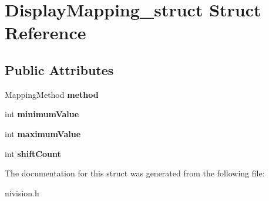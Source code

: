 \hypertarget{structDisplayMapping__struct}{
\section{DisplayMapping\_\-struct Struct Reference}
\label{structDisplayMapping__struct}
}
\subsection*{Public Attributes}
\begin{DoxyCompactItemize}
\item 
\hypertarget{structDisplayMapping__struct_aa364e1e9956c18eeb2474fef9ee14c87}{
MappingMethod {\bfseries method}}
\label{structDisplayMapping__struct_aa364e1e9956c18eeb2474fef9ee14c87}

\item 
\hypertarget{structDisplayMapping__struct_a49cef936a2beae40e29127ff5b674e04}{
int {\bfseries minimumValue}}
\label{structDisplayMapping__struct_a49cef936a2beae40e29127ff5b674e04}

\item 
\hypertarget{structDisplayMapping__struct_ac0ee2521d09af4ac69e3a80a6c5aa0fa}{
int {\bfseries maximumValue}}
\label{structDisplayMapping__struct_ac0ee2521d09af4ac69e3a80a6c5aa0fa}

\item 
\hypertarget{structDisplayMapping__struct_a675da1584800b0b6621e061528bc734b}{
int {\bfseries shiftCount}}
\label{structDisplayMapping__struct_a675da1584800b0b6621e061528bc734b}

\end{DoxyCompactItemize}


The documentation for this struct was generated from the following file:\begin{DoxyCompactItemize}
\item 
nivision.h\end{DoxyCompactItemize}
